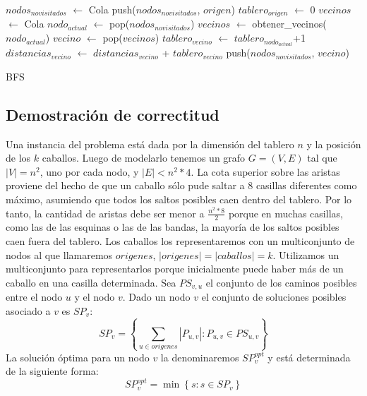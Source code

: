\begin{algorithm}[H]
  \begin{algorithmic}
    \STATE $nodos_{no visitados}$ $\gets$ Cola
    \STATE push($nodos_{no visitados}$, $origen$)
    \STATE $tablero_{origen}$ $\gets$ 0
    \STATE $vecinos$ $\gets$ Cola
      \STATE $nodo_{actual}$ $\gets$ pop($nodos_{no visitados}$)
      \STATE $vecinos$ $\gets$ obtener\_vecinos($nodo_{actual}$)
        \STATE $vecino$ $\gets$ pop($vecinos$)
          \STATE $tablero_{vecino}$ $\gets$ $tablero_{nodo_{actual}}$+1
          \STATE $distancias_{vecino}$ $\gets$ $distancias_{vecino}$ + $tablero_{vecino}$
          \STATE push($nodos_{no visitados}$, $vecino$)
        \ENDIF
      \ENDWHILE
    \ENDWHILE
    \caption{BFS}
  \end{algorithmic}
\end{algorithm}

\subsection{Demostración de correctitud}
Una instancia del problema está dada por la dimensión del tablero $n$ y la posición
de los $k$ caballos. Luego de modelarlo tenemos un grafo $G = (V, E)$ tal que $\left\vert{V}\right\vert = n^2$, uno
por cada nodo, y $\left\vert{E}\right\vert < n^2 * 4$. La cota superior sobre las aristas proviene del hecho de que
un caballo sólo pude saltar a 8 casillas diferentes como máximo, asumiendo que todos los
saltos posibles caen dentro del tablero. Por lo tanto, la cantidad de aristas debe ser menor
a $\frac{n^2 * 8}{2}$ porque en muchas casillas, como las de las esquinas o las de las bandas, la
mayoría de los saltos posibles caen fuera del tablero. Los caballos los representaremos con un multiconjunto
de nodos al que llamaremos $origenes$, $\left\vert{origenes}\right\vert = \left\vert{caballos}\right\vert = k$. Utilizamos un multiconjunto 
para representarlos porque inicialmente puede haber más de un caballo en una casilla determinada.
Sea $PS_{v,u}$ el conjunto de los caminos posibles entre el nodo $u$ y el nodo $v$.
Dado un nodo $v$ el conjunto de soluciones posibles asociado a $v$ es $SP_v$:
\begin{displaymath}
  SP_v = \left\{ { \sum_{u \in origenes} \left\vert{P_{u,v}}\right\vert : P_{u, v} \in PS_{u, v}} \right\}
\end{displaymath}
La solución óptima para un nodo $v$ la denominaremos $SP_v^{opt}$ y está determinada de la siguiente forma:
\begin{displaymath}
  SP_v^{opt} = \min \left\{ {s : s \in SP_v} \right\} 
\end{displaymath}

